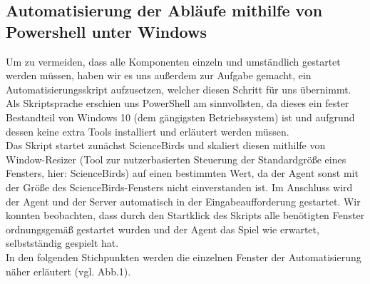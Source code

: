\subsection{Automatisierung der Abläufe mithilfe von Powershell unter Windows}
Um zu vermeiden, dass alle Komponenten einzeln und umständlich gestartet werden müssen, haben wir es uns außerdem zur Aufgabe gemacht, ein Automatisierungsskript aufzusetzen, welcher diesen Schritt für uns übernimmt. Als Skriptsprache erschien uns PowerShell am sinnvollsten, da dieses ein fester Bestandteil von Windows 10 (dem gängigsten Betriebssystem) ist und aufgrund dessen keine extra Tools installiert und erläutert werden müssen. \\Das Skript startet zunächst ScienceBirds und skaliert diesen mithilfe von Window-Resizer (Tool zur nutzerbasierten Steuerung der Standardgröße eines Fensters, hier: ScienceBirds) auf einen bestimmten Wert, da der Agent sonst mit der Größe des ScienceBirds-Fensters nicht einverstanden ist. Im Anschluss wird der Agent und der Server automatisch in der Eingabeaufforderung gestartet. Wir konnten beobachten, dass durch den Startklick des Skripts alle benötigten Fenster ordnungsgemäß gestartet wurden und der Agent das Spiel wie erwartet, selbstständig gespielt hat.\\ In den folgenden Stichpunkten werden die einzelnen Fenster der Automatisierung näher erläutert (vgl. Abb.1).
